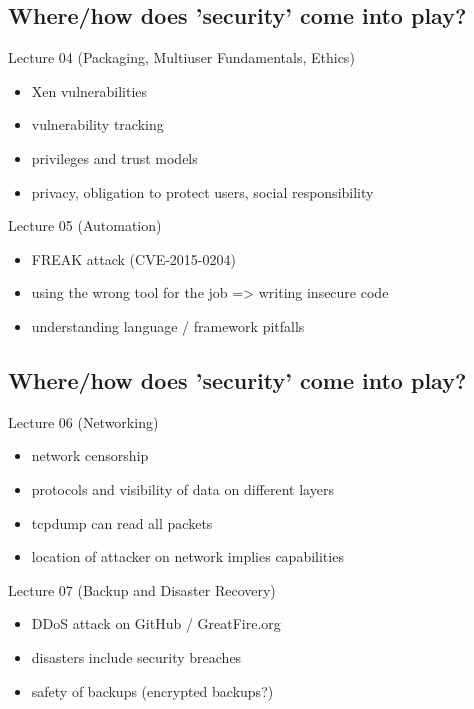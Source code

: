 \documentclass[xga]{xdvislides}
\begin{document}
\subsection{Where/how does 'security' come into play?}
Lecture 04 (Packaging, Multiuser Fundamentals, Ethics)
\begin{itemize}
	\item Xen vulnerabilities
	\item vulnerability tracking
	\item privileges and trust models
	\item privacy, obligation to protect users, social responsibility
\end{itemize}
\vspace{.5in}
Lecture 05 (Automation)
\begin{itemize}
	\item FREAK attack (CVE-2015-0204)
	\item using the wrong tool for the job => writing insecure code
	\item understanding language / framework pitfalls
\end{itemize}

\subsection{Where/how does 'security' come into play?}
Lecture 06 (Networking)
\begin{itemize}
	\item network censorship
	\item protocols and visibility of data on different layers
	\item tcpdump can read all packets
	\item location of attacker on network implies capabilities
\end{itemize}
\vspace{.5in}
Lecture 07 (Backup and Disaster Recovery)
\begin{itemize}
	\item DDoS attack on GitHub / GreatFire.org
	\item disasters include security breaches
	\item safety of backups (encrypted backups?)
\end{itemize}
\end{document}
